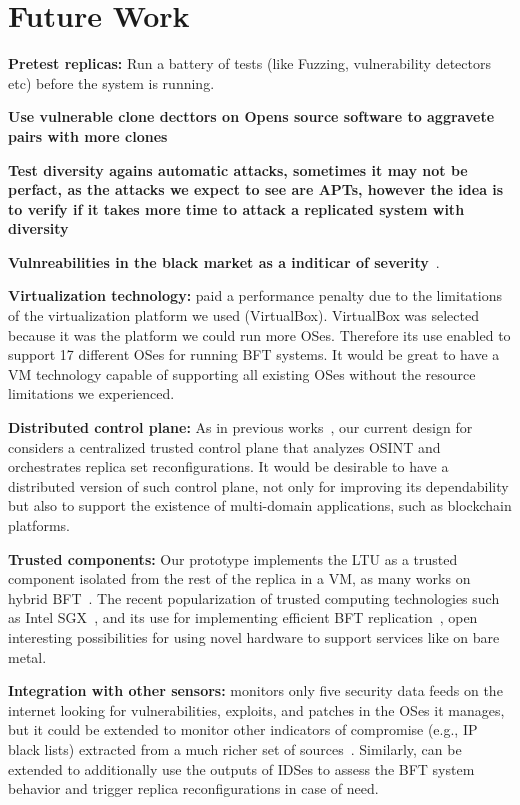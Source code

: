 \section{Future Work}

\textbf{Pretest replicas:}
Run a battery of tests (like Fuzzing, vulnerability detectors etc) before the system is running.

\textbf{Use vulnerable clone decttors on Opens source software to aggravete pairs with more clones}~\cite{Kim:2017}

\textbf{Test diversity agains automatic attacks, sometimes it may not be perfact, as the attacks we expect to see are APTs, however the idea is to verify if it takes more time to attack a replicated system with diversity}~\cite{Hu:2015}

\textbf{Vulnreabilities in the black market as a inditicar of severity}~\cite{Allodi:2014}.

\textbf{Virtualization technology:}
\system paid a performance penalty due to the limitations of the virtualization platform we used (VirtualBox).
VirtualBox was selected because it was the platform we could run more OSes.
Therefore its use enabled \system to support 17 different OSes for running BFT systems.
It would be great to have a VM technology capable of supporting all existing OSes without the resource limitations we experienced.

\textbf{Distributed control plane:}
As in previous works~\cite{Roeder:2010,Platania:2014}, our current design for \system considers a centralized trusted control plane that analyzes OSINT and orchestrates replica set reconfigurations.
It would be desirable to have a distributed version of such control plane, not only for improving its dependability but also to support the existence of multi-domain applications, such as blockchain platforms.

\textbf{Trusted components:}
Our prototype implements the LTU as a trusted component isolated from the rest of the replica in a VM, as many works on hybrid BFT~\cite{Veronese:2013,Roeder:2010,Platania:2014,Sousa:2010,Distler:2011}.
The recent popularization of trusted computing technologies such as Intel SGX~\cite{sgx}, and its use for implementing efficient BFT replication~\cite{Behl:2017}, open interesting possibilities for using novel hardware to support services like \system on bare metal.

\textbf{Integration with other sensors:}
\system monitors only five security data feeds on the internet looking for vulnerabilities, exploits, and patches in the OSes it manages, but it could be extended to monitor other indicators of compromise (e.g., IP black lists) extracted from a much richer set of sources~\cite{Liao:2016,Sabottke:2015}.
Similarly, \system can be extended to additionally use the outputs of IDSes to assess the BFT system behavior and trigger replica reconfigurations in case of need.

